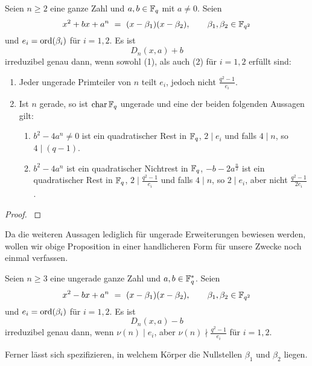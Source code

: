\begin{proposition}
  \label{satz:dickson_irred}
  Seien $n\geq 2$ eine ganze Zahl und $a,b \in \mathbb{F}_q$ mit $a \neq 0$.
  Seien
  \[ x^2 + bx +a^n \ =\  (x-\beta_1)(x-\beta_2), \qquad 
    \beta_1,\beta_2 \in \mathbb{F}_{q^2}\]
  und $e_i = \operatorname{ord}(\beta_i)$ für $i=1,2$. Es ist
  \[ D_n(x,a) + b \]
  irreduzibel genau dann, wenn sowohl (1), als auch (2) für $i=1,2$ erfüllt
  sind:
  \begin{enumerate}
    \item Jeder ungerade Primteiler von $n$ teilt $e_i$, jedoch nicht
      $\tfrac{q^2-1}{e_i}$.
    \item Ist $n$ gerade, so ist $\operatorname{char} \mathbb{F}_q$ ungerade und eine der beiden
      folgenden Aussagen gilt:
      \begin{enumerate}[label=(\arabic*')]
        \item $b^2-4a^n \neq 0$ ist ein quadratischer Rest in $\mathbb{F}_q$, $2\mid e_i$
          und falls $4\mid n$, so $4 \mid (q-1)$.
        \item $b^2-4a^n$ ist ein quadratischer Nichtrest in $\mathbb{F}_q$,
          $-b-2a^\frac n 2$ ist ein quadratischer Rest in $\mathbb{F}_q$, 
          $2 \mid \tfrac{q^2-1}{e_i}$ und falls $4\mid n$, so $2\mid e_i$, 
          aber nicht $\tfrac{q^2-1}{2e_i}$.
      \end{enumerate}
  \end{enumerate}
\end{proposition}
\begin{proof}
  \autocite[Theorem 4]{gao1994}
\end{proof}

Da die weiteren Aussagen lediglich für ungerade Erweiterungen bewiesen werden,
wollen wir obige Proposition in einer handlicheren Form für unsere Zwecke 
noch einmal verfassen.

\begin{kor}
  \label{kor:dickson_irred}
  Seien $n\geq 3$ eine ungerade ganze Zahl und $a,b\in \mathbb{F}_q^\ast$. Seien
  \[ x^2 - bx +a^n \ =\  (x-\beta_1)(x-\beta_2), \qquad 
    \beta_1,\beta_2 \in \mathbb{F}_{q^2}\]
  und $e_i = \operatorname{ord}(\beta_i)$ für $i=1,2$. Es ist
  \[ D_n(x,a) - b \]
  irreduzibel genau dann, wenn $\nu(n)\mid e_i$, aber 
  $\nu(n)\nmid \tfrac{q^2-1}{e_i}$ für $i=1,2$.
\end{kor}

Ferner lässt sich spezifizieren, in welchem Körper die Nullstellen $\beta_1$ 
und $\beta_2$ liegen.

